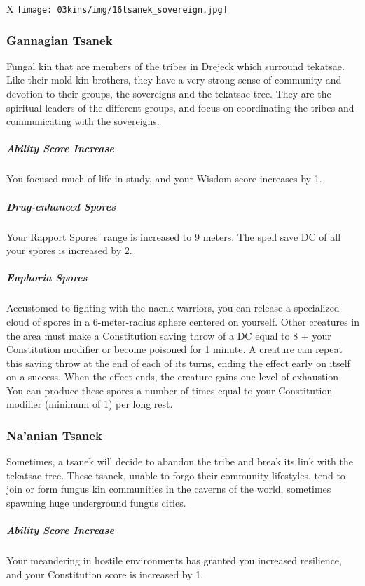 \begin{table*}[b]%
    \begin{DndTable}[width=\linewidth]{X}
        \texttt{[image: 03kins/img/16tsanek\_sovereign.jpg]}
    \end{DndTable}
\end{table*}

\subsubsection{Gannagian Tsanek}
Fungal kin that are members of the tribes in Drejeck which surround tekatsae.
Like their mold kin brothers, they have a very strong sense of community and devotion to their groups, the sovereigns and the tekatsae tree.
They are the spiritual leaders of the different groups, and focus on coordinating the tribes and communicating with the sovereigns.

\subparagraph{Ability Score Increase} You focused much of life in study, and your Wisdom score increases by 1.

\subparagraph{Drug-enhanced Spores} Your Rapport Spores' range is increased to 9 meters.
The spell save DC of all your spores is increased by 2.

\subparagraph{Euphoria Spores} Accustomed to fighting with the naenk warriors, you can release a specialized cloud of spores in a 6-meter-radius sphere centered on yourself.
Other creatures in the area must make a Constitution saving throw of a DC equal to 8 + your Constitution modifier or become poisoned for 1 minute.
A creature can repeat this saving throw at the end of each of its turns, ending the effect early on itself on a success.
When the effect ends, the creature gains one level of exhaustion.
You can produce these spores a number of times equal to your Constitution modifier (minimum of 1) per long rest.

\subsubsection{Na'anian Tsanek}
Sometimes, a tsanek will decide to abandon the tribe and break its link with the tekatsae tree.
These tsanek, unable to forgo their community lifestyles, tend to join or form fungus kin communities in the caverns of the world, sometimes spawning huge underground fungus cities.

\subparagraph{Ability Score Increase} Your meandering in hostile environments has granted you increased resilience, and your Constitution score is increased by 1.

